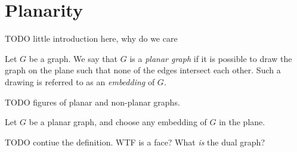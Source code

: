 \section{Planarity}

TODO little introduction here, why do we care

\begin{definition}
    Let $G$ be a graph. We say that $G$ is a \emph{planar graph} if it is possible to draw the graph on the plane such that none of the edges intersect each other. Such a drawing is referred to as an \emph{embedding} of $G$.
\end{definition}

TODO figures of planar and non-planar graphs.

\begin{definition}
    Let $G$ be a planar graph, and choose any embedding of $G$ in the plane.
    
    
    TODO contiue the definition. WTF is a face?
    What \emph{is} the dual graph?
\end{definition}